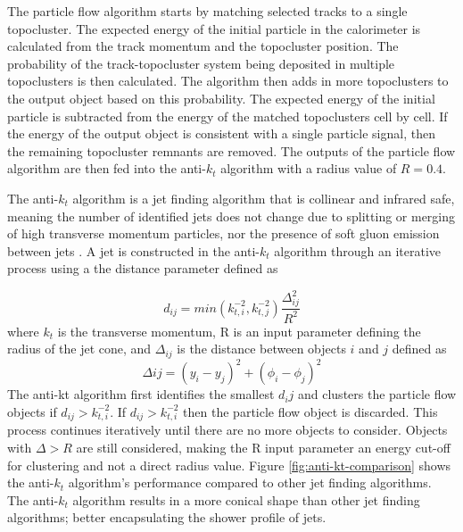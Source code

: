 		The particle flow algorithm starts by matching selected tracks to a single topocluster. The expected energy of the initial particle in the calorimeter is calculated from the track momentum and the topocluster position. The probability of the track-topocluster system being deposited in multiple topoclusters is then calculated. The algorithm then adds in more topoclusters to the output object based on this probability. The expected energy of the initial particle is subtracted from the energy of the matched topoclusters cell by cell. If the energy of the output object is consistent with a single particle signal, then the remaining topocluster remnants are removed. The outputs of the particle flow algorithm are then fed into the anti-$k_t$ algorithm \cite{anti-kt} with a radius value of $R=0.4$. 

		The anti-$k_t$ algorithm is a jet finding algorithm that is collinear and infrared safe, meaning the number of identified jets does not change due to splitting or merging of high transverse momentum particles, nor the presence of soft gluon emission between jets \cite{Cacciari_2008}. A jet is constructed in the anti-$k_t$ algorithm through an iterative process using a the distance parameter defined as 

		\begin{equation}\label{eqn:anti-kt-distance}
		d_{ij} = min(k_{t,i}^{-2} , k_{t,j}^{-2}) \frac{\Delta_{ij}^{2}}{R^2} 
		\end{equation}
		where $k_t$ is the transverse momentum, R is an input parameter defining the radius of the jet cone, and $\Delta_{ij}$ is the distance between objects $i$ and $j$ defined as
		\begin{equation}\label{eqn:anti-kt-delta}
		\Delta{ij} = (y_i - y_j)^2 + (\phi_i - \phi_j)^2
		\end{equation}
		The anti-kt algorithm first identifies the smallest $d_ij$ and clusters the particle flow objects if $d_{ij}>k_{t,i}^{-2}$. If $d_{ij}>k_{t,i}^{-2}$ then the particle flow object is discarded. This process continues iteratively until there are no more objects to consider. Objects with $\Delta>R$ are still considered, making the R input parameter an energy cut-off for clustering and not a direct radius value. Figure \ref{fig:anti-kt-comparison} shows the anti-$k_{t}$ algorithm's performance compared to other jet finding algorithms. The anti-$k_{t}$ algorithm results in a more conical shape than other jet finding algorithms; better encapsulating the shower profile of jets.

